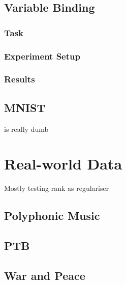 \subsection{Variable Binding}
\subsubsection{Task}

\subsubsection{Experiment Setup}

\subsubsection{Results}

\subsection{MNIST}
is really dumb

\section{Real-world Data}
Mostly testing rank as regulariser
\subsection{Polyphonic Music}
\subsection{PTB}
\subsection{War and Peace}